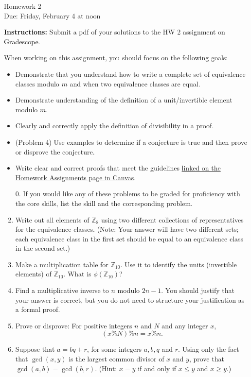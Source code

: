\documentclass[12pt]{article}
\newcommand{\Z}{\mathbb{Z}}
\begin{document}
\begin{center}
{\Large Homework 2}\\
Due: Friday,  February 4 at noon\\


\end{center}
{\bf Instructions:} Submit a pdf of your solutions to the HW 2 assignment on Gradescope. 

When working on this assignment, you should focus on the following goals:
\begin{itemize}
\item Demonstrate that you understand how to write a complete set of equivalence classes modulo $m$ and when two equivalence classes are equal. 
\item Demonstrate understanding of the definition of a unit/invertible element modulo $m$.  
\item Clearly and correctly apply the definition of divisibility in a proof. 
\item (Problem 4) Use examples to determine if a conjecture is true and then prove or disprove the conjecture. 
\item Write clear and correct proofs that meet the guidelines \href{https://canvas.umn.edu/courses/292043/pages/writing-guidelines}{linked on the Homework Assignments page in Canvas}.
\end{itemize}

\begin{enumerate}
\item[0.] If you would like any of these problems to be graded for proficiency with the core skills, list the skill and the corresponding problem. 
\item Write out all elements of $\Z_{8}$ using two different collections of representatives for the equivalence classes.  (Note: Your answer will have two different sets; each equivalence class in the first set should be equal to an equivalence class in the second set.)
\item Make a multiplication table for $\Z_{10}$. Use it to identify the units (invertible elements) of $\Z_{10}$.  What is $\phi(\Z_{10})$?
\item Find a multiplicative inverse to $n$ modulo $2n-1$. You should justify that your answer is correct, but you do not need to structure your justification as a formal proof. 

\item Prove or disprove: For positive integers $n$ and $N$ and any integer $x$, $$(x\% N)\% n= x\% n.$$

\item Suppose that $a=bq+r$, for some integers $a,b, q$ and $r$. Using only the fact that $\gcd(x,y)$ is the largest common divisor of $x$ and $y$, prove that $\gcd(a,b)=\gcd(b,r)$.  (Hint: $x=y$ if and only if $x\le y$ and $x\ge y$.)

\end{enumerate}
\end{document}
